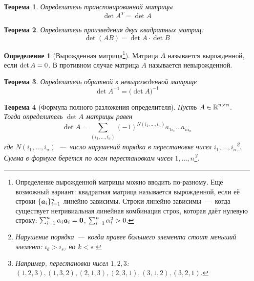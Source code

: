 \documentclass[a4paper,12pt]{article}
\newtheorem{theorem}{Теорема}[section]
\theoremstyle{definition}
\newtheorem{definition}{Определение}[section]
\theoremstyle{remark}
\theoremstyle{remark}
\begin{document}
  \begin{theorem}
    Определитель транспонированной матрицы
    \[
      \det A^T = \det A
    \]
  \end{theorem}
  
  \begin{theorem}
    Определитель произведения двух квадратных матриц:
    \[
      \det (AB) = \det A \cdot \det B
    \]
  \end{theorem}
  
  \begin{definition}[Вырожденная матрица\footnote{Определение вырожденной матрицы можно вводить по-разному. Ещё возможный вариант: квадратная матрица называется вырожденной, если её строки $\{\boldsymbol a_i\}_{i=1}^n$ линейно зависимы. Строки линейно зависимы~---~когда существует нетривиальная линейная комбинация строк, которая даёт нулевую строку: $\sum_{i=1}^n \alpha_i \bds a_i \hm= \bds 0$, $\sum_{i=1}^n \alpha_i^2 \hm > 0$.}]
    Матрица $A$ называется вырожденной, если $\det A \hm= 0$.
    В противном случае матрица $A$ называется невырожденной.
  \end{definition}
  
  \begin{theorem}
    Определитель обратной к \emph{невырожденной} матрице
    \[
      \det A^{-1} = \bigl(\det A\bigl)^{-1}
    \]
  \end{theorem}
  
  \begin{theorem}[Формула полного разложения определителя]\label{theor:complete-expansion}
    Пусть $A \in \operatorname{\mathbb R}^{n \times n}$.
    Тогда определитель $\det A$ матрицы равен
    \begin{equation}
      \label{eq:complete-expansion}
      \det A = \sum_{(i_1, \ldots, i_n)} (-1)^{N(i_1, \ldots, i_n)} a_{1 i_1} \ldots a_{n i_n}
    \end{equation}
    где $N(i_1, \ldots, i_n)$~---~число нарушений порядка в перестановке чисел $i_1, \ldots, i_n$\footnote{Нарушение порядка~---~когда правее большего элемента стоит меньший элемент: $i_k > i_s$, но $k < s$.}.
    Сумма в формуле берётся по всем перестановкам чисел $1, \ldots, n$\footnote{Например, перестановки чисел $1, 2, 3$: $(1, 2, 3), (1, 3, 2), (2, 1, 3), (2, 3, 1), (3, 1, 2), (3, 2, 1)$.}.
  \end{theorem}
  
\end{document}

